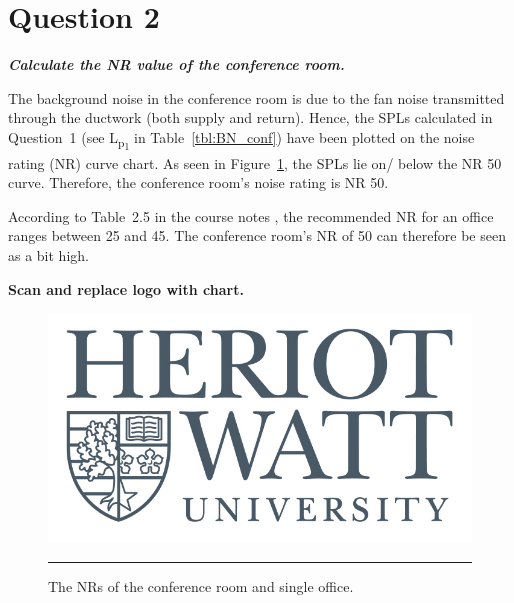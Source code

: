 \section{Question 2}

\textit{\textbf{Calculate the NR value of the conference room.}}

The background noise in the conference room is due to the fan noise transmitted through the ductwork (both supply and return).
Hence, the SPLs calculated in Question~1 (see L\textsubscript{p\textsubscript{1}} in Table~\ref{tbl:BN_conf}) have been plotted on the noise rating (NR) curve chart.
As seen in Figure~\ref{fig:NR_chart}, the SPLs lie on/ below the NR 50 curve.
Therefore, the conference room's noise rating is NR 50.

According to Table~2.5 in the course notes \citep{unit2}, the recommended NR for an office ranges between 25 and 45.
The conference room's NR of 50 can therefore be seen as a bit high.

\textbf{Scan and replace logo with chart.}

\begin{figure}[htbp]
	\centering
	\includegraphics[width=\textwidth]{figures/HWlogo2016.jpg}
	\rule{\textwidth}{0.5pt} %
	\caption{The NRs of the conference room and single office.}
	\label{fig:NR_chart}
\end{figure}